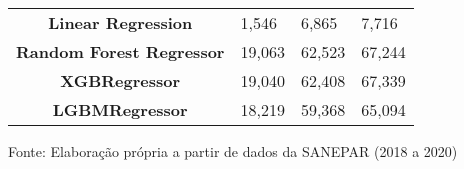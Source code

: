 \begin{table}[H]
\begin{tabular}{@{}clll@{}}
\textbf{Linear Regression}        & 1,546                             & 6,865                            & 7,716                             \\
\textbf{Random Forest Regressor}  & 19,063                            & 62,523                           & 67,244                            \\
\textbf{XGBRegressor}             & 19,040                            & 62,408                           & 67,339                            \\
\textbf{LGBMRegressor}            & 18,219                            & 59,368                           & 65,094                            \\ \hline
	\end{tabular}

Fonte: Elaboração própria a partir de dados da SANEPAR (2018 a 2020)
\end{table}

